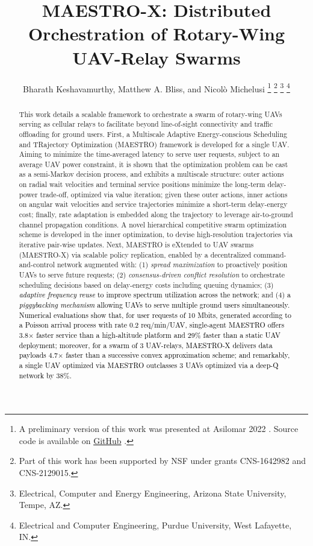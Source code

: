 \documentclass[12pt, draftcls, onecolumn]{IEEEtran}
\title{MAESTRO-X: Distributed Orchestration of Rotary-Wing UAV-Relay Swarms}
\author{Bharath Keshavamurthy\IEEEauthorrefmark{1}, Matthew A. Bliss\IEEEauthorrefmark{2}, and Nicol\`{o} Michelusi\IEEEauthorrefmark{1}
\thanks{A preliminary version of this work was presented at Asilomar 2022 \cite{ASILOMAR}. Source code is available on \href{https://github.com/bharathkeshavamurthy/MAESTRO-X.git}{GitHub} \cite{MAESTRO-X}.}
\thanks{Part of this work has been supported by NSF under grants CNS-1642982 and CNS-2129015.}
\thanks{\IEEEauthorrefmark{1}Electrical, Computer and Energy Engineering, Arizona State University, Tempe, AZ.}
\thanks{\IEEEauthorrefmark{2}Electrical and Computer Engineering, Purdue University, West Lafayette, IN.}
\vspace{-6mm}
}
\theoremstyle{plain}
\theoremstyle{definition}
\theoremstyle{remark}
\newcommand\hlt[1]{\textcolor{black}{#1}}
\begin{document}

\maketitle
\thispagestyle{plain}
\pagestyle{plain}
\vspace{-12mm}
\begin{abstract}
This work details a scalable framework to orchestrate a swarm of rotary-wing UAVs serving as cellular relays to facilitate beyond line-of-sight connectivity and traffic offloading for ground users. First, a Multiscale Adaptive Energy-conscious Scheduling and TRajectory Optimization (MAESTRO) framework is developed for a single UAV. Aiming to minimize the time-averaged latency to serve user requests, subject to an average UAV power constraint, it is shown that the optimization problem can be cast as a semi-Markov decision process, and exhibits a multiscale structure: outer actions on radial wait velocities and terminal service positions minimize the long-term delay-power trade-off, optimized via value iteration; given these outer actions, inner actions on angular wait velocities and service trajectories minimize a short-term delay-energy cost; finally, rate adaptation is embedded along the trajectory to leverage air-to-ground channel propagation conditions. A novel hierarchical competitive swarm optimization scheme is developed in the inner optimization, to devise high-resolution trajectories via iterative pair-wise updates. Next, MAESTRO is eXtended to UAV swarms (MAESTRO-X) via scalable policy replication, enabled by a decentralized command-and-control network augmented with: 
(1) \emph{spread maximization} to proactively position UAVs to serve future requests;
(2) \emph{consensus-driven conflict resolution} to orchestrate scheduling decisions based on delay-energy costs including queuing dynamics;
(3) \hlt{\emph{adaptive frequency reuse} to improve spectrum utilization across the network}; and 
(4) \hlt{a \emph{piggybacking mechanism} allowing UAVs to serve multiple ground users simultaneously}. 
\hlt{Numerical evaluations show that, for user requests of 10 Mbits, generated according to a Poisson arrival process with rate 0.2 req/min/UAV, single-agent MAESTRO offers 3.8$\times$ faster service than a high-altitude platform and 29\% faster than a static UAV deployment; moreover, for a swarm of 3 UAV-relays, MAESTRO-X delivers data payloads 4.7$\times$ faster than a successive convex approximation scheme; and remarkably, a single UAV optimized via MAESTRO outclasses 3 UAVs optimized via a deep-Q network by $38$\%.}
\end{abstract}
\vspace{-4mm}
\end{document}
